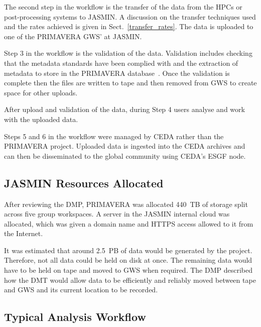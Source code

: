 \documentclass[gmd, manuscript]{copernicus}
\begin{document}

The second step in the workflow is the transfer of the data from the HPCs or post-processing systems to JASMIN. A discussion on the transfer techniques used and the rates achieved is given in Sect.~\ref{transfer_rates}. The data is uploaded to one of the PRIMAVERA GWS' at JASMIN.

Step 3 in the workflow is the validation of the data. Validation includes checking that the metadata standards have been complied with and the extraction of metadata to store in the PRIMAVERA database~\citep{Seddon2020}. Once the validation is complete then the files are written to tape and then removed from GWS to create space for other uploads.

After upload and validation of the data, during Step 4 users analyse and work with the uploaded data. 

Steps 5 and 6 in the workflow were managed by CEDA rather than the PRIMAVERA project. Uploaded data is ingested into the CEDA archives and can then be disseminated to the global community using CEDA's ESGF node.


\subsection{JASMIN Resources Allocated}

After reviewing the DMP, PRIMAVERA was allocated 440~TB of storage split across  five group workspaces. A server in the JASMIN internal cloud was allocated, which was given a domain name and  HTTPS access allowed to it from the Internet.

It was estimated that around 2.5~PB of data would be generated by the project. Therefore, not all data could be held on disk at once. The remaining data would have to be held on tape and moved to GWS when required. The DMP described how the DMT would allow data to be efficiently and reliably moved between tape and GWS and its current location to be recorded.

\subsection{Typical Analysis Workflow}
\end{document}
